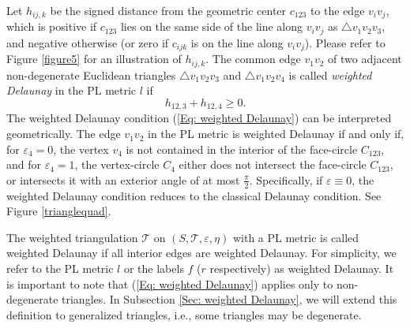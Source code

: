 \documentclass[12pt]{amsart}
\theoremstyle{definition}
\begin{document}
Let $h_{ij,k}$ be the signed distance from the geometric center $c_{123}$ to the edge $v_iv_j$, which is positive if $c_{123}$ lies on the same side of the line along $v_iv_j$ as $\triangle v_1v_2v_3$, and negative otherwise (or zero if $c_{ijk}$ is on the line along $v_iv_j$).
Please refer to Figure \ref{figure5} for an illustration of $h_{ij,k}$.
The common edge $v_1v_2$ of two adjacent non-degenerate Euclidean triangles $\triangle v_1v_2v_3$ and $\triangle v_1v_2v_4$ is called \textit{weighted Delaunay} in the PL metric $l$ if
\begin{equation}\label{Eq: weighted Delaunay}
h_{12,3}+h_{12,4}\geq 0.
\end{equation}
The weighted Delaunay condition (\ref{Eq: weighted Delaunay}) can be interpreted geometrically.
The edge $v_1v_2$ in the PL metric is weighted Delaunay if and only if, for $\varepsilon_4=0$, the vertex $v_4$ is not contained in the interior of the face-circle $C_{123}$, and for $\varepsilon_4=1$, the vertex-circle $C_4$ either does not intersect the face-circle $C_{123}$, or intersects it with an exterior angle of at most $\frac{\pi}{2}$.
Specifically, if $\varepsilon\equiv0$, the weighted Delaunay condition reduces to the classical Delaunay condition. See Figure \ref{trianglequad}.

The weighted triangulation $\mathcal{T}$ on $(S, \mathcal{T}, \varepsilon, \eta)$ with a PL metric is called weighted Delaunay if all interior edges are weighted Delaunay.
For simplicity, we refer to the PL metric $l$ or the labels $f$ ($r$ respectively) as weighted Delaunay.
It is important to note that (\ref{Eq: weighted Delaunay}) applies only to non-degenerate triangles.
In Subsection \ref{Sec: weighted Delaunay}, we will extend this definition to generalized triangles, i.e., some triangles may be degenerate.
\end{document}
